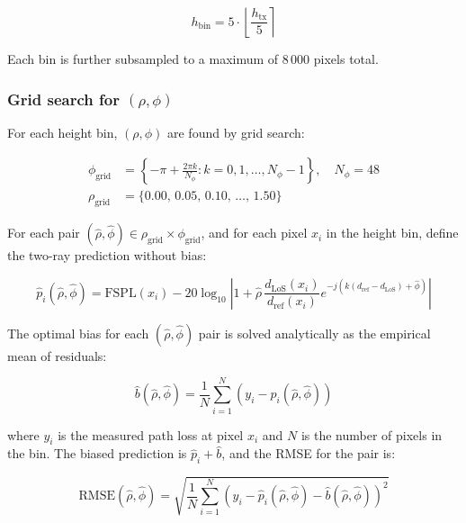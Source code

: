 \documentclass[11pt,a4paper]{article}
\begin{document}
\begin{equation}
h_{\mathrm{bin}} = 5 \cdot \left\lfloor \frac{h_{\mathrm{tx}}}{5} \right\rceil
\end{equation}

Each bin is further subsampled to a maximum of 8\,000 pixels total.

\subsubsection{Grid search for $(\rho, \phi)$}

For each height bin, $(\rho, \phi)$ are found by grid search:

\begin{align}
\phi_{\mathrm{grid}} &= \left\{-\pi + \frac{2\pi k}{N_\phi} : k = 0, 1, \ldots, N_\phi - 1\right\},
\quad N_\phi = 48 \label{eq:phi_grid}\\
\rho_{\mathrm{grid}} &= \{0.00,\, 0.05,\, 0.10,\, \ldots,\, 1.50\}
\label{eq:rho_grid}
\end{align}

For each pair $(\hat\rho, \hat\phi) \in \rho_{\mathrm{grid}} \times
\phi_{\mathrm{grid}}$, and for each pixel $x_i$ in the height bin, define
the two-ray prediction without bias:

\begin{equation}
\hat p_i(\hat\rho, \hat\phi)
=
\mathrm{FSPL}(x_i)
- 20\log_{10}
\left|
1 + \hat\rho\,\frac{d_{\mathrm{LoS}}(x_i)}{d_{\mathrm{ref}}(x_i)}
e^{-j\left(k(d_{\mathrm{ref}}-d_{\mathrm{LoS}})+\hat\phi\right)}
\right|
\end{equation}

The optimal bias for each $(\hat\rho, \hat\phi)$ pair is solved analytically
as the empirical mean of residuals:

\begin{equation}
\hat b(\hat\rho, \hat\phi)
=
\frac{1}{N}\sum_{i=1}^{N}
\left(y_i - \hat p_i(\hat\rho, \hat\phi)\right)
\end{equation}

where $y_i$ is the measured path loss at pixel $x_i$ and $N$ is the number
of pixels in the bin. The biased prediction is $\hat p_i + \hat b$, and the
RMSE for the pair is:

\begin{equation}
\mathrm{RMSE}(\hat\rho, \hat\phi)
=
\sqrt{\frac{1}{N}\sum_{i=1}^{N}
\left(y_i - \hat p_i(\hat\rho,\hat\phi) - \hat b(\hat\rho,\hat\phi)\right)^2}
\label{eq:rmse_grid}
\end{equation}
\end{document}
